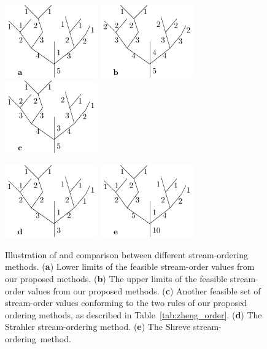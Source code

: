 \documentclass[water,article,accept,pdftex,moreauthors]{Definitions/mdpi}
\begin{document}
\begin{table}[H]
\end{table}
\vspace{-6pt}

\begin{figure}[H]
    \begin{center}
        \includegraphics[width=4cm]{fig/stream_order.pdf}
        \hspace{0.5cm}
        \includegraphics[width=4cm]{fig/stream_order_r.pdf}
        \hspace{0.5cm}
        \includegraphics[width=4cm]{fig/stream_order_a.pdf}

        \includegraphics[width=4cm]{fig/stream_order_strahler.pdf}
        \hspace{0.5cm}
        \includegraphics[width=4cm]{fig/stream_order_shreve.pdf}
    \end{center}
    \caption{Illustration of and comparison between different stream-ordering methods. (\textbf{a}) Lower limits of the feasible stream-order values from our proposed methods. (\textbf{b}) The upper limits of the feasible stream-order values from our proposed methods. (\textbf{c}) Another feasible set of stream-order values conforming to the two rules of our proposed ordering methods, as described in Table~\ref{tab:zheng_order}. (\textbf{d}) The Strahler stream-ordering method. (\textbf{e}) The Shreve stream-ordering~method. \label{fig:zheng_order}}
\end{figure}
\end{document}
